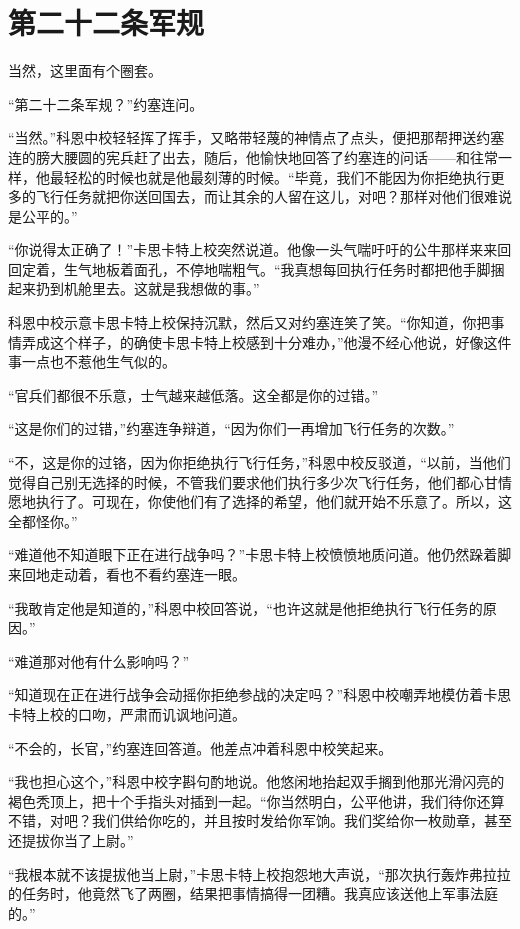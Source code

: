 \chapter{第二十二条军规}
 
    当然，这里面有个圈套。

    “第二十二条军规？”约塞连问。

    “当然。”科恩中校轻轻挥了挥手，又略带轻蔑的神情点了点头，便把那帮押送约塞连的膀大腰圆的宪兵赶了出去，随后，他愉快地回答了约塞连的问话——和往常一样，他最轻松的时候也就是他最刻薄的时候。“毕竟，我们不能因为你拒绝执行更多的飞行任务就把你送回国去，而让其余的人留在这儿，对吧？那样对他们很难说是公平的。”

    “你说得太正确了！”卡思卡特上校突然说道。他像一头气喘吁吁的公牛那样来来回回定着，生气地板着面孔，不停地喘粗气。“我真想每回执行任务时都把他手脚捆起来扔到机舱里去。这就是我想做的事。”

    科恩中校示意卡思卡特上校保持沉默，然后又对约塞连笑了笑。“你知道，你把事情弄成这个样子，的确使卡思卡特上校感到十分难办，”他漫不经心他说，好像这件事一点也不惹他生气似的。

    “官兵们都很不乐意，士气越来越低落。这全都是你的过错。”

    “这是你们的过错，”约塞连争辩道，“因为你们一再增加飞行任务的次数。”

    “不，这是你的过铬，因为你拒绝执行飞行任务，”科恩中校反驳道，“以前，当他们觉得自己别无选择的时候，不管我们要求他们执行多少次飞行任务，他们都心甘情愿地执行了。可现在，你使他们有了选择的希望，他们就开始不乐意了。所以，这全都怪你。”

    “难道他不知道眼下正在进行战争吗？”卡思卡特上校愤愤地质问道。他仍然跺着脚来回地走动着，看也不看约塞连一眼。

    “我敢肯定他是知道的，”科恩中校回答说，“也许这就是他拒绝执行飞行任务的原因。”

    “难道那对他有什么影响吗？”

    “知道现在正在进行战争会动摇你拒绝参战的决定吗？”科恩中校嘲弄地模仿着卡思卡特上校的口吻，严肃而讥讽地问道。

    “不会的，长官，”约塞连回答道。他差点冲着科恩中校笑起来。

    “我也担心这个，”科恩中校字斟句酌地说。他悠闲地抬起双手搁到他那光滑闪亮的褐色秃顶上，把十个手指头对插到一起。“你当然明白，公平他讲，我们待你还算不错，对吧？我们供给你吃的，并且按时发给你军饷。我们奖给你一枚勋章，甚至还提拔你当了上尉。”

    “我根本就不该提拔他当上尉，”卡思卡特上校抱怨地大声说，“那次执行轰炸弗拉拉的任务时，他竟然飞了两圈，结果把事情搞得一团糟。我真应该送他上军事法庭的。”

